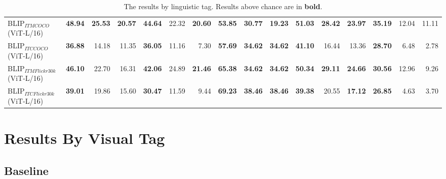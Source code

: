 \begin{table*}[!ht]
\begin{adjustbox}{max width=\textwidth}
\begin{tabular}{l|rrr|rrr|rrr|rrr|rrr}
 BLIP$_{ITM COCO}$ (ViT-L/16)        & \textbf{48.94} & \textbf{25.53} & \textbf{20.57} & \textbf{44.64} & 22.32          & \textbf{20.60} & \textbf{53.85} & \textbf{30.77} & \textbf{19.23} & \textbf{51.03} & \textbf{28.42} & \textbf{23.97} & \textbf{35.19} & 12.04          & 11.11          \\
 BLIP$_{ITC COCO}$ (ViT-L/16)        & \textbf{36.88} & 14.18          & 11.35          & \textbf{36.05} & 11.16          & 7.30           & \textbf{57.69} & \textbf{34.62} & \textbf{34.62} & \textbf{41.10} & 16.44          & 13.36          & \textbf{28.70} & 6.48           & 2.78           \\
 BLIP$_{ITM Flickr30k}$ (ViT-L/16)   & \textbf{46.10} & 22.70          & 16.31          & \textbf{42.06} & 24.89          & \textbf{21.46} & \textbf{65.38} & \textbf{34.62} & \textbf{34.62} & \textbf{50.34} & \textbf{29.11} & \textbf{24.66} & \textbf{30.56} & 12.96          & 9.26           \\
 BLIP$_{ITC Flickr30k}$ (ViT-L/16)   & \textbf{39.01} & 19.86          & 15.60          & \textbf{30.47} & 11.59          & 9.44           & \textbf{69.23} & \textbf{38.46} & \textbf{38.46} & \textbf{39.38} & 20.55          & \textbf{17.12} & \textbf{26.85} & 4.63           & 3.70           \\
          \bottomrule
  \end{tabular}
  \end{adjustbox}
  \caption{The results by linguistic tag. Results above chance are in \textbf{bold}.}
    \label{tab:results-by-ling-tag-ours}
\end{table*}

\section{Results By Visual Tag}

\subsection{Baseline}

